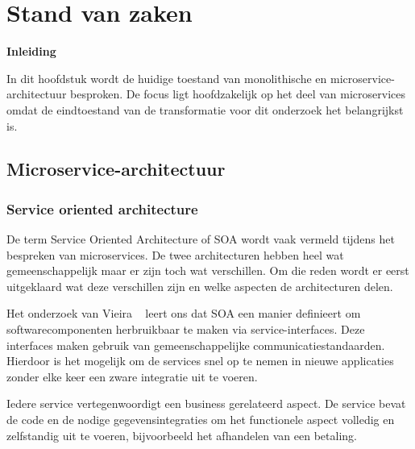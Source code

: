\label{ch:stand-van-zaken}
\graphicspath{{./img/}}

\chapter{Stand van zaken}
\textbf{Inleiding}

In dit hoofdstuk wordt de huidige toestand van monolithische en microservice-architectuur besproken. De focus ligt hoofdzakelijk op het deel van microservices omdat de eindtoestand van de transformatie voor dit onderzoek het belangrijkst is.

\section{Microservice-architectuur}

\subsection{Service oriented architecture}
De term Service Oriented Architecture of SOA wordt vaak vermeld tijdens het bespreken van microservices. De twee architecturen hebben heel wat gemeenschappelijk maar er zijn toch wat verschillen. Om die reden wordt er eerst uitgeklaard wat deze verschillen zijn en welke aspecten de architecturen delen. 

Het onderzoek van Vieira ~\autocite{Vieira2019} leert ons dat SOA een manier definieert om softwarecomponenten herbruikbaar te maken via service-interfaces. Deze interfaces maken gebruik van gemeenschappelijke communicatiestandaarden. Hierdoor is het mogelijk om de services snel op te nemen in nieuwe applicaties zonder elke keer een zware integratie uit te voeren. 

Iedere service vertegenwoordigt een business gerelateerd aspect. De service bevat de code en de nodige gegevensintegraties om het functionele aspect volledig en zelfstandig uit te voeren, bijvoorbeeld het afhandelen van een betaling.\\

